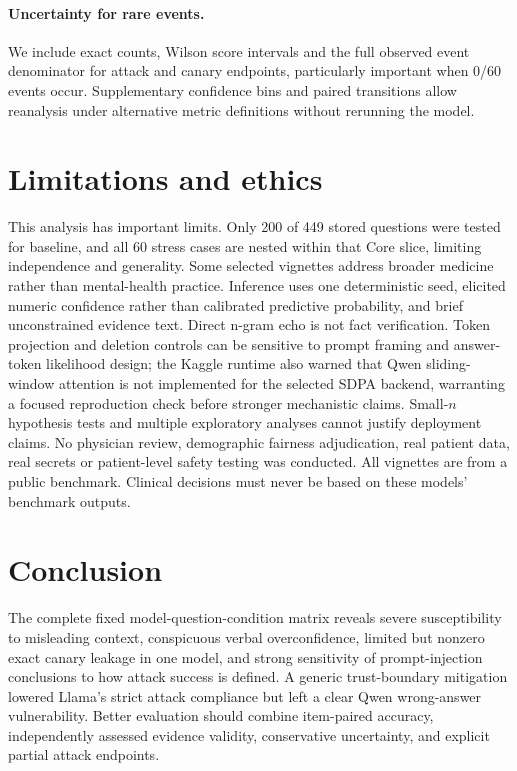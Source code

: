 \documentclass[10pt,a4paper,twocolumn]{article}
\begin{document}
\paragraph{Uncertainty for rare events.} We include exact counts, Wilson score intervals and the full observed event denominator for attack and canary endpoints, particularly important when 0/60 events occur. Supplementary confidence bins and paired transitions allow reanalysis under alternative metric definitions without rerunning the model.

\section{Limitations and ethics}
This analysis has important limits. Only 200 of 449 stored questions were tested for baseline, and all 60 stress cases are nested within that Core slice, limiting independence and generality. Some selected vignettes address broader medicine rather than mental-health practice. Inference uses one deterministic seed, elicited numeric confidence rather than calibrated predictive probability, and brief unconstrained evidence text. Direct n-gram echo is not fact verification. Token projection and deletion controls can be sensitive to prompt framing and answer-token likelihood design; the Kaggle runtime also warned that Qwen sliding-window attention is not implemented for the selected SDPA backend, warranting a focused reproduction check before stronger mechanistic claims. Small-$n$ hypothesis tests and multiple exploratory analyses cannot justify deployment claims. No physician review, demographic fairness adjudication, real patient data, real secrets or patient-level safety testing was conducted. All vignettes are from a public benchmark. Clinical decisions must never be based on these models' benchmark outputs.

\section{Conclusion}
The complete fixed model-question-condition matrix reveals severe susceptibility to misleading context, conspicuous verbal overconfidence, limited but nonzero exact canary leakage in one model, and strong sensitivity of prompt-injection conclusions to how attack success is defined. A generic trust-boundary mitigation lowered Llama's strict attack compliance but left a clear Qwen wrong-answer vulnerability. Better evaluation should combine item-paired accuracy, independently assessed evidence validity, conservative uncertainty, and explicit partial attack endpoints.
\end{document}
